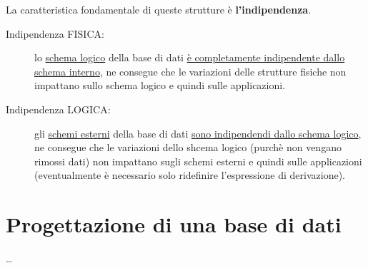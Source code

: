 \documentclass[a4paper, 12pt]{book}
\begin{document}
    
    La caratteristica fondamentale di queste strutture è \textbf{l'indipendenza}.
    \begin{description}
      \item[Indipendenza FISICA:] lo \underline{schema logico} della base di dati \underline{è completamente indipendente dallo schema interno}, ne consegue che le variazioni delle strutture fisiche non impattano sullo schema logico e quindi sulle applicazioni.
      \item[Indipendenza LOGICA:] gli \underline{schemi esterni} della base di dati \underline{sono indipendendi dallo schema logico}, ne consegue che le variazioni dello shcema logico (purchè non vengano rimossi dati) non impattano sugli schemi esterni e quindi sulle applicazioni (eventualmente è necessario solo ridefinire l'espressione di derivazione).
    \end{description}
     

    \section*{Progettazione di una base di dati}
  

    \dots
\end{document}
